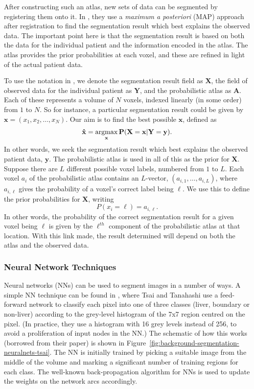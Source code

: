 After constructing such an atlas, new sets of data can be segmented by registering them onto it. In \cite{park03}, they use a \emph{maximum a posteriori} (MAP) approach after registration to find the segmentation result which best explains the observed data. The important point here is that the segmentation result is based on both the data for the individual patient and the information encoded in the atlas. The atlas provides the prior probabilities at each voxel, and these are refined in light of the actual patient data.

To use the notation in \cite{park03}, we denote the segmentation result field as $\mathbf{X}$, the field of observed data for the individual patient as $\mathbf{Y}$, and the probabilistic atlas as $\mathbf{A}$. Each of these represents a volume of $N$ voxels, indexed linearly (in some order) from $1$ to $N$. So for instance, a particular segmentation result could be given by $\mathbf{x} = (x_1, x_2, \ldots, x_N)$. Our aim is to find the best possible $\mathbf{x}$, defined as
%
\[
\mathbf{\hat{x}} = \mathop{\rm argmax}_{\mathbf{x}} \mathbf{P}(\mathbf{X} = \mathbf{x} | \mathbf{Y} = \mathbf{y}).
\]
%
In other words, we seek the segmentation result which best explains the observed patient data, $\mathbf{y}$. The probabilistic atlas is used in all of this as the prior for $\mathbf{X}$. Suppose there are $L$ different possible voxel labels, numbered from $1$ to $L$. Each voxel $a_i$ of the probabilistic atlas contains an $L$-vector, $(a_{i,1}, \ldots, a_{i,L})$, where $a_{i,\ell}$ gives the probability of a voxel's correct label being $\ell$. We use this to define the prior probabilities for $\mathbf{X}$, writing
%
\[
P(x_i = \ell) = a_{i,\ell}.
\]
%
In other words, the probability of the correct segmentation result for a given voxel being $\ell$ is given by the $\ell^{th}$ component of the probabilistic atlas at that location. With this link made, the result determined will depend on both the atlas and the observed data.

\subsubsection{Neural Network Techniques}

Neural networks (NNs) can be used to segment images in a number of ways. A simple NN technique can be found in \cite{tsai94}, where Tsai and Tanahashi use a feed-forward network to classify each pixel into one of three classes (liver, boundary or non-liver) according to the grey-level histogram of the 7x7 region centred on the pixel. (In practice, they use a histogram with 16 grey levels instead of 256, to avoid a proliferation of input nodes in the NN.) The schematic of how this works (borrowed from their paper) is shown in Figure~\ref{fig:background-segmentation-neuralnets-tsai}. The NN is initially trained by picking a suitable image from the middle of the volume and marking a significant number of training regions for each class. The well-known back-propagation algorithm for NNs \cite{aima-backprop} is used to update the weights on the network arcs accordingly.

